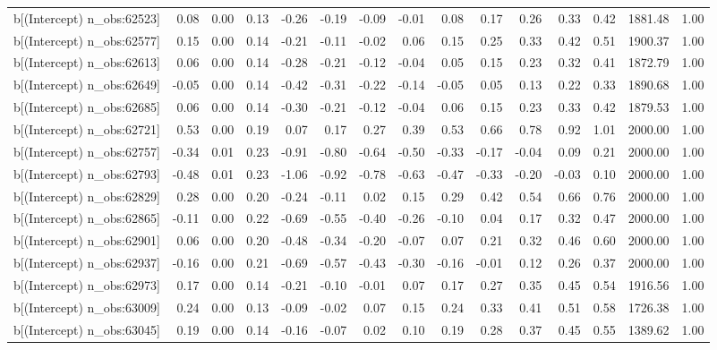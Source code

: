 \begin{table}[ht]
\begin{tabular}{rrrrrrrrrrrrrrr}
  b[(Intercept) n\_obs:62523] & 0.08 & 0.00 & 0.13 & -0.26 & -0.19 & -0.09 & -0.01 & 0.08 & 0.17 & 0.26 & 0.33 & 0.42 & 1881.48 & 1.00 \\ 
  b[(Intercept) n\_obs:62577] & 0.15 & 0.00 & 0.14 & -0.21 & -0.11 & -0.02 & 0.06 & 0.15 & 0.25 & 0.33 & 0.42 & 0.51 & 1900.37 & 1.00 \\ 
  b[(Intercept) n\_obs:62613] & 0.06 & 0.00 & 0.14 & -0.28 & -0.21 & -0.12 & -0.04 & 0.05 & 0.15 & 0.23 & 0.32 & 0.41 & 1872.79 & 1.00 \\ 
  b[(Intercept) n\_obs:62649] & -0.05 & 0.00 & 0.14 & -0.42 & -0.31 & -0.22 & -0.14 & -0.05 & 0.05 & 0.13 & 0.22 & 0.33 & 1890.68 & 1.00 \\ 
  b[(Intercept) n\_obs:62685] & 0.06 & 0.00 & 0.14 & -0.30 & -0.21 & -0.12 & -0.04 & 0.06 & 0.15 & 0.23 & 0.33 & 0.42 & 1879.53 & 1.00 \\ 
  b[(Intercept) n\_obs:62721] & 0.53 & 0.00 & 0.19 & 0.07 & 0.17 & 0.27 & 0.39 & 0.53 & 0.66 & 0.78 & 0.92 & 1.01 & 2000.00 & 1.00 \\ 
  b[(Intercept) n\_obs:62757] & -0.34 & 0.01 & 0.23 & -0.91 & -0.80 & -0.64 & -0.50 & -0.33 & -0.17 & -0.04 & 0.09 & 0.21 & 2000.00 & 1.00 \\ 
  b[(Intercept) n\_obs:62793] & -0.48 & 0.01 & 0.23 & -1.06 & -0.92 & -0.78 & -0.63 & -0.47 & -0.33 & -0.20 & -0.03 & 0.10 & 2000.00 & 1.00 \\ 
  b[(Intercept) n\_obs:62829] & 0.28 & 0.00 & 0.20 & -0.24 & -0.11 & 0.02 & 0.15 & 0.29 & 0.42 & 0.54 & 0.66 & 0.76 & 2000.00 & 1.00 \\ 
  b[(Intercept) n\_obs:62865] & -0.11 & 0.00 & 0.22 & -0.69 & -0.55 & -0.40 & -0.26 & -0.10 & 0.04 & 0.17 & 0.32 & 0.47 & 2000.00 & 1.00 \\ 
  b[(Intercept) n\_obs:62901] & 0.06 & 0.00 & 0.20 & -0.48 & -0.34 & -0.20 & -0.07 & 0.07 & 0.21 & 0.32 & 0.46 & 0.60 & 2000.00 & 1.00 \\ 
  b[(Intercept) n\_obs:62937] & -0.16 & 0.00 & 0.21 & -0.69 & -0.57 & -0.43 & -0.30 & -0.16 & -0.01 & 0.12 & 0.26 & 0.37 & 2000.00 & 1.00 \\ 
  b[(Intercept) n\_obs:62973] & 0.17 & 0.00 & 0.14 & -0.21 & -0.10 & -0.01 & 0.07 & 0.17 & 0.27 & 0.35 & 0.45 & 0.54 & 1916.56 & 1.00 \\ 
  b[(Intercept) n\_obs:63009] & 0.24 & 0.00 & 0.13 & -0.09 & -0.02 & 0.07 & 0.15 & 0.24 & 0.33 & 0.41 & 0.51 & 0.58 & 1726.38 & 1.00 \\ 
  b[(Intercept) n\_obs:63045] & 0.19 & 0.00 & 0.14 & -0.16 & -0.07 & 0.02 & 0.10 & 0.19 & 0.28 & 0.37 & 0.45 & 0.55 & 1389.62 & 1.00 \\ 

\end{tabular}
\end{table}
